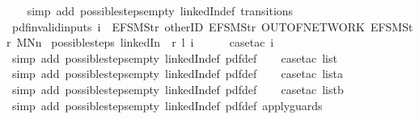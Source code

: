\begin{isabellebody}
%
\isadelimproof
\ \ %
\endisadelimproof
%
\isatagproof
{}\isamarkupfalse%
\ {\isacharparenleft}simp\ add{\isacharcolon}\ possible{\isacharunderscore}steps{\isacharunderscore}empty\ linkedIn{\isacharunderscore}def\ transitions{\isacharparenright}%
\endisatagproof
{\isafoldproof}%
%
\isadelimproof
\isanewline
%
\endisadelimproof
\isanewline
{}\isamarkupfalse%
\ pdf{\isacharunderscore}{}{\isacharunderscore}invalid{\isacharunderscore}inputs{\isacharcolon}\ {\isachardoublequoteopen}i\ {\isasymnoteq}\ {\isacharbrackleft}EFSM{\isachardot}Str\ {\isacharprime}{\isacharprime}otherID{\isacharprime}{\isacharprime}{\isacharcomma}\ EFSM{\isachardot}Str\ {\isacharprime}{\isacharprime}OUT{\isacharunderscore}OF{\isacharunderscore}NETWORK{\isacharprime}{\isacharprime}{\isacharcomma}\ EFSM{\isachardot}Str\ {\isacharprime}{\isacharprime}MNn{}{\isacharprime}{\isacharprime}{\isacharbrackright}\ {\isasymLongrightarrow}\isanewline
possible{\isacharunderscore}steps\ linkedIn\ {}\ r\ l\ i\ {\isacharequal}\ {\isacharbraceleft}{\isacharbar}{\isacharbar}{\isacharbraceright}{\isachardoublequoteclose}\isanewline
%
\isadelimproof
\ \ %
\endisadelimproof
%
\isatagproof
{}\isamarkupfalse%
\ {\isacharparenleft}case{\isacharunderscore}tac\ i{\isacharparenright}\isanewline
\ \ \ \isamarkupfalse%
\ {\isacharparenleft}simp\ add{\isacharcolon}\ possible{\isacharunderscore}steps{\isacharunderscore}empty\ linkedIn{\isacharunderscore}def\ pdf{}{\isacharunderscore}def{\isacharparenright}\isanewline
\ \ \isamarkupfalse%
\ {\isacharparenleft}case{\isacharunderscore}tac\ list{\isacharparenright}\isanewline
\ \ \ \isamarkupfalse%
\ {\isacharparenleft}simp\ add{\isacharcolon}\ possible{\isacharunderscore}steps{\isacharunderscore}empty\ linkedIn{\isacharunderscore}def\ pdf{}{\isacharunderscore}def{\isacharparenright}\isanewline
\ \ \isamarkupfalse%
\ {\isacharparenleft}case{\isacharunderscore}tac\ lista{\isacharparenright}\isanewline
\ \ \ \isamarkupfalse%
\ {\isacharparenleft}simp\ add{\isacharcolon}\ possible{\isacharunderscore}steps{\isacharunderscore}empty\ linkedIn{\isacharunderscore}def\ pdf{}{\isacharunderscore}def{\isacharparenright}\isanewline
\ \ \isamarkupfalse%
\ {\isacharparenleft}case{\isacharunderscore}tac\ listb{\isacharparenright}\isanewline
\ \ \isamarkupfalse%
\ {\isacharparenleft}simp\ add{\isacharcolon}\ possible{\isacharunderscore}steps{\isacharunderscore}empty\ linkedIn{\isacharunderscore}def\ pdf{}{\isacharunderscore}def\ apply{\isacharunderscore}guards{\isacharparenright}\isanewline

\end{isabellebody}

